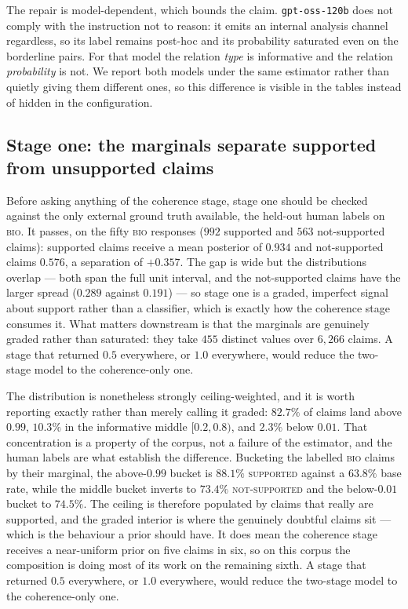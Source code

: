 The repair is model-dependent, which bounds the claim. \texttt{gpt-oss-120b} does not comply with the
instruction not to reason: it emits an internal analysis channel regardless, so its label remains
post-hoc and its probability saturated even on the borderline pairs. For that model the relation
\emph{type} is informative and the relation \emph{probability} is not. We report both models under the
same estimator rather than quietly giving them different ones, so this difference is visible in the
tables instead of hidden in the configuration.

\subsection{Stage one: the marginals separate supported from unsupported claims}
\label{sec-fc-stage-one}

Before asking anything of the coherence stage, stage one should be checked against the only external
ground truth available, the held-out human labels on \textsc{bio}. It passes, on the fifty
\textsc{bio} responses ($992$ supported and $563$ not-supported claims): supported claims receive a mean
posterior of $0.934$ and not-supported claims $0.576$, a separation of $\mathbf{+0.357}$. The gap is
wide but the distributions overlap --- both span the full unit interval, and the not-supported claims
have the larger spread ($0.289$ against $0.191$) --- so stage one is a graded, imperfect signal about
support rather than a classifier, which is exactly how the coherence stage consumes it. What matters
downstream is that the marginals are genuinely graded rather than saturated: they take $455$ distinct
values over $6{,}266$ claims. A stage that returned $0.5$ everywhere, or $1.0$ everywhere, would reduce
the two-stage model to the coherence-only one.

The distribution is nonetheless strongly ceiling-weighted, and it is worth reporting exactly rather than
merely calling it graded: $82.7\%$ of claims land above $0.99$, $10.3\%$ in the informative middle
$[0.2, 0.8)$, and $2.3\%$ below $0.01$. That concentration is a property of the corpus, not a failure of
the estimator, and the human labels are what establish the difference. Bucketing the labelled
\textsc{bio} claims by their marginal, the above-$0.99$ bucket is $88.1\%$ \textsc{supported} against a
$63.8\%$ base rate, while the middle bucket inverts to $73.4\%$ \textsc{not-supported} and the
below-$0.01$ bucket to $74.5\%$. The ceiling is therefore populated by claims that really are supported,
and the graded interior is where the genuinely doubtful claims sit --- which is the behaviour a prior
should have. It does mean the coherence stage receives a near-uniform prior on five claims in six, so
on this corpus the composition is doing most of its work on the remaining sixth. A
stage that returned $0.5$ everywhere, or $1.0$ everywhere, would reduce the two-stage model to the
coherence-only one.

